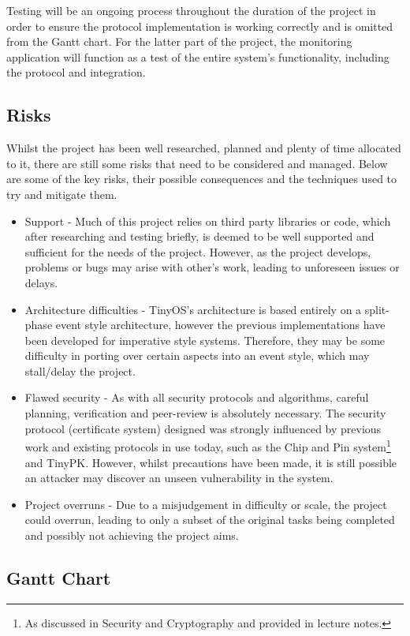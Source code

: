 \documentclass{mprop}
\begin{document}
Testing will be an ongoing process throughout the duration of the project in order to ensure the protocol implementation is working correctly and is omitted from the Gantt chart. For the latter part of the project, the monitoring application will function as a test of the entire system's functionality, including the protocol and integration.



\subsection{Risks} %
\label{sub:risks}
Whilst the project has been well researched, planned and plenty of time allocated to it, there are still some risks that need to be considered and managed. Below are some of the key risks, their possible consequences and the techniques used to try and mitigate them.
\begin{itemize}
  \item Support - Much of this project relies on third party libraries or code, which after researching and testing briefly, is deemed to be well supported and sufficient for the needs of the project. However, as the project develops, problems or bugs may arise with other's work, leading to unforeseen issues or delays.
  \item Architecture difficulties - TinyOS's architecture is based entirely on a split-phase event style architecture, however the previous implementations have been developed for imperative style systems. Therefore, they may be some difficulty in porting over certain aspects into an event style, which may stall/delay the project.
  \item Flawed security - As with all security protocols and algorithms, careful planning, verification and peer-review is absolutely necessary. The security protocol (certificate system) designed was strongly influenced by previous work and existing protocols in use today, such as the Chip and Pin system\footnote{As discussed in Security and Cryptography and provided in lecture notes.} and TinyPK. However, whilst precautions have been made, it is still possible an attacker may discover an unseen vulnerability in the system. 
  \item Project overruns - Due to a misjudgement in difficulty or scale, the project could overrun, leading to only a subset of the original tasks being completed and possibly not achieving the project aims.
\end{itemize}

\subsection{Gantt Chart} %
\label{sub:gantt_chart}


\newpage


\end{document}
